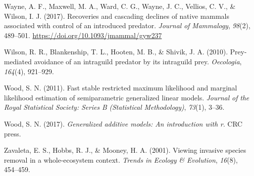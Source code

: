 \documentclass[]{elsarticle} %
\begin{document}
\leavevmode\hypertarget{ref-wayne2017recoveries}{}%
Wayne, A. F., Maxwell, M. A., Ward, C. G., Wayne, J. C., Vellios, C. V., \& Wilson, I. J. (2017). Recoveries and cascading declines of native mammals associated with control of an introduced predator. \emph{Journal of Mammalogy}, \emph{98}(2), 489--501. \url{https://doi.org/10.1093/jmammal/gyw237}

\leavevmode\hypertarget{ref-wilson2010prey}{}%
Wilson, R. R., Blankenship, T. L., Hooten, M. B., \& Shivik, J. A. (2010). Prey-mediated avoidance of an intraguild predator by its intraguild prey. \emph{Oecologia}, \emph{164}(4), 921--929.

\leavevmode\hypertarget{ref-wood2011}{}%
Wood, S. N. (2011). Fast stable restricted maximum likelihood and marginal likelihood estimation of semiparametric generalized linear models. \emph{Journal of the Royal Statistical Society: Series B (Statistical Methodology)}, \emph{73}(1), 3--36.

\leavevmode\hypertarget{ref-wood2017}{}%
Wood, S. N. (2017). \emph{Generalized additive models: An introduction with r}. CRC press.

\leavevmode\hypertarget{ref-zavaleta2001}{}%
Zavaleta, E. S., Hobbs, R. J., \& Mooney, H. A. (2001). Viewing invasive species removal in a whole-ecosystem context. \emph{Trends in Ecology \& Evolution}, \emph{16}(8), 454--459.
\end{document}

